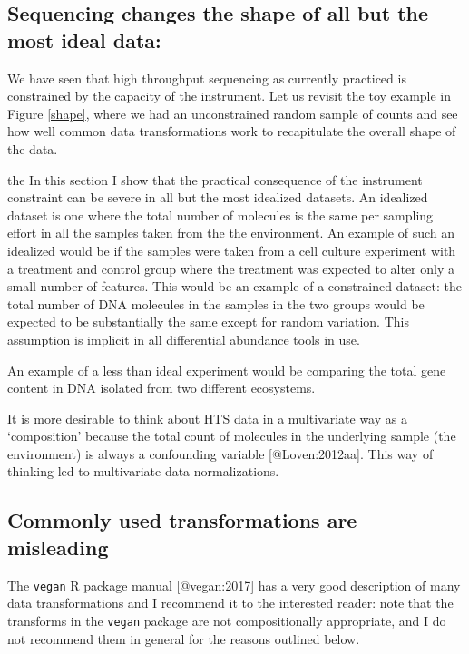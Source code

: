\documentclass[
  onecolumn]{article}
\begin{document}
\hypertarget{sequencing-changes-the-shape-of-all-but-the-most-ideal-data}{%
\subsection{Sequencing changes the shape of all but the most ideal data:}\label{sequencing-changes-the-shape-of-all-but-the-most-ideal-data}}

We have seen that high throughput sequencing as currently practiced is constrained by the capacity of the instrument. Let us revisit the toy example in Figure \ref{shape}, where we had an unconstrained random sample of counts and see how well common data transformations work to recapitulate the overall shape of the data.

the In this section I show that the practical consequence of the instrument constraint can be severe in all but the most idealized datasets. An idealized dataset is one where the total number of molecules is the same per sampling effort in all the samples taken from the the environment. An example of such an idealized would be if the samples were taken from a cell culture experiment with a treatment and control group where the treatment was expected to alter only a small number of features. This would be an example of a constrained dataset: the total number of DNA molecules in the samples in the two groups would be expected to be substantially the same except for random variation. This assumption is implicit in all differential abundance tools in use.

An example of a less than ideal experiment would be comparing the total gene content in DNA isolated from two different ecosystems.

It is more desirable to think about HTS data in a multivariate way as a `composition' because the total count of molecules in the underlying sample (the environment) is always a confounding variable {[}@Loven:2012aa{]}. This way of thinking led to multivariate data normalizations.

\hypertarget{commonly-used-transformations-are-misleading}{%
\subsection{Commonly used transformations are misleading}\label{commonly-used-transformations-are-misleading}}

The \texttt{vegan} R package manual {[}@vegan:2017{]} has a very good description of many data transformations and I recommend it to the interested reader: note that the transforms in the \texttt{vegan} package are not compositionally appropriate, and I do not recommend them in general for the reasons outlined below.
\end{document}
